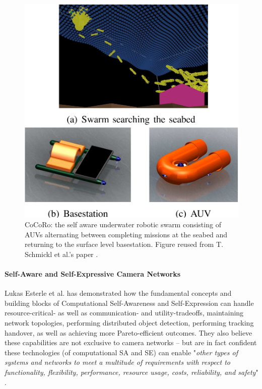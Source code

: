 			\begin{figure}[!ht]
			\centering
			\includegraphics[width=0.65\columnwidth]{Assets/DocSegments/Chapters/Background/Figures/Schema/cocoro.PNG}
			\caption[CoCoRo: the self aware underwater robotic AUV swarm.]{CoCoRo: the self aware underwater robotic swarm consisting of AUVs alternating between completing missions at the seabed and returning to the surface level basestation. Figure reused from T. Schmickl et al.'s paper \cite{cocoro}.}
			\label{fig:cocoro}
			\end{figure}

			\paragraph{Self-Aware and Self-Expressive Camera Networks \nl}

			Lukas Esterle et al. \cite{esterle_camera} has demonstrated how the fundamental concepts and building blocks of Computational Self-Awareness and Self-Expression can handle resource-critical- as well as communication- and utility-tradeoffs, maintaining network topologies, performing distributed object detection, performing tracking handover, as well as achieving more Pareto-efficient outcomes. They also believe these capabilities are not exclusive to camera networks -- but are in fact confident these technologies (of computational SA and SE) can enable "\textit{other types of systems and networks to meet a multitude of requirements with respect to functionality, flexibility, performance, resource usage, costs, reliability, and safety}" \cite{esterle_camera}.
			



